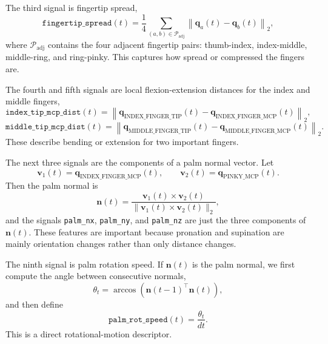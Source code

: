 \documentclass[10pt,twocolumn]{article}
\begin{document}
The third signal is fingertip spread,
\begin{equation}
\texttt{fingertip\_spread}(t)=\frac{1}{4}\sum_{(a,b)\in \mathcal{P}_{\mathrm{adj}}} \left\|\mathbf{q}_{a}(t)-\mathbf{q}_{b}(t)\right\|_2,
\end{equation}
where $\mathcal{P}_{\mathrm{adj}}$ contains the four adjacent fingertip pairs: thumb-index, index-middle, middle-ring, and ring-pinky. This captures how spread or compressed the fingers are.

The fourth and fifth signals are local flexion-extension distances for the index and middle fingers,
\begin{equation}
\texttt{index\_tip\_mcp\_dist}(t)=\left\|\mathbf{q}_{\mathrm{INDEX\_FINGER\_TIP}}(t)-\mathbf{q}_{\mathrm{INDEX\_FINGER\_MCP}}(t)\right\|_2,
\end{equation}
\begin{equation}
\texttt{middle\_tip\_mcp\_dist}(t)=\left\|\mathbf{q}_{\mathrm{MIDDLE\_FINGER\_TIP}}(t)-\mathbf{q}_{\mathrm{MIDDLE\_FINGER\_MCP}}(t)\right\|_2.
\end{equation}
These describe bending or extension for two important fingers.

The next three signals are the components of a palm normal vector. Let
\begin{equation}
\mathbf{v}_1(t)=\mathbf{q}_{\mathrm{INDEX\_FINGER\_MCP}}(t),
\qquad
\mathbf{v}_2(t)=\mathbf{q}_{\mathrm{PINKY\_MCP}}(t).
\end{equation}
Then the palm normal is
\begin{equation}
\mathbf{n}(t)=\frac{\mathbf{v}_1(t) \times \mathbf{v}_2(t)}{\|\mathbf{v}_1(t) \times \mathbf{v}_2(t)\|_2},
\end{equation}
and the signals \texttt{palm\_nx}, \texttt{palm\_ny}, and \texttt{palm\_nz} are just the three components of $\mathbf{n}(t)$. These features are important because pronation and supination are mainly orientation changes rather than only distance changes.

The ninth signal is palm rotation speed. If $\mathbf{n}(t)$ is the palm normal, we first compute the angle between consecutive normals,
\begin{equation}
\theta_t = \arccos\!\left(\mathbf{n}(t-1)^\top \mathbf{n}(t)\right),
\end{equation}
and then define
\begin{equation}
\texttt{palm\_rot\_speed}(t)=\frac{\theta_t}{dt}.
\end{equation}
This is a direct rotational-motion descriptor.
\end{document}
